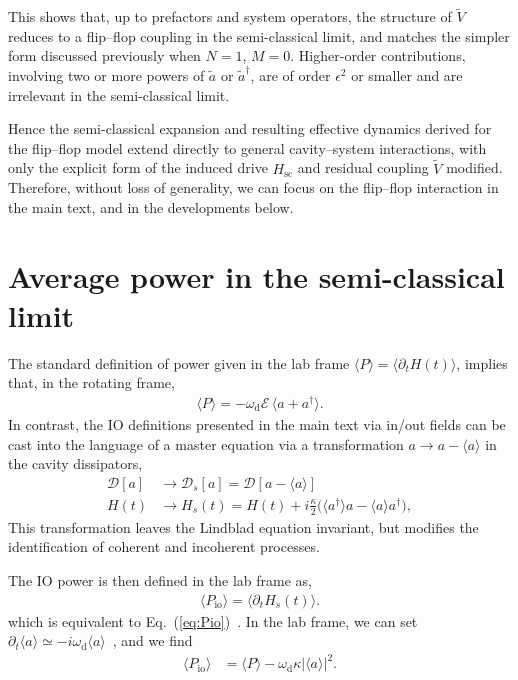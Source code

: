 \documentclass[aps,twocolumn,10pt,prl,floatfix,nofootinbib, superscriptaddress]{revtex4-2}
\begin{document}
This shows that, up to prefactors and system operators, the structure of $\tilde{V}$ reduces to a flip--flop coupling in the semi-classical limit, and matches the simpler form discussed previously when $N=1$, $M=0$.
Higher-order contributions, involving two or more powers of $\tilde{a}$ or $\tilde{a}^\dagger$, are of order $\epsilon^2$ or smaller and are irrelevant in the semi-classical limit.

Hence the semi-classical expansion and resulting effective dynamics derived for the flip--flop model extend directly to general cavity--system interactions, with only the explicit form of the induced drive $H_\text{sc}$ and residual coupling $\tilde{V}$ modified.
Therefore, without loss of generality, we can focus on the flip--flop interaction in the main text, and in the developments below.

\section{Average power in the semi-classical limit}

The standard definition of power given in the lab frame $\langle P \rangle  = \langle \partial_t H(t)\rangle$, implies that, in the rotating frame,
\begin{align}
    \langle P \rangle = -\omega_\text{d} \mathcal{E}\, \langle a + a^\dagger \rangle.
\end{align}
In contrast, the IO definitions presented in the main text via in/out fields can be cast into the language of a master equation via a transformation $a \to a - \langle a \rangle$ in the cavity dissipators,
\begin{align}
    \mathcal{D}[a] &\to \mathcal{D}_s[a] = \mathcal{D}[a - \langle a \rangle]\\
    H(t) &\to H_s(t) = H(t) + i\frac{\kappa}{2}\big(\langle a^\dagger\rangle a - \langle a\rangle a^\dagger\big),
\end{align}
This transformation leaves the Lindblad equation invariant, but modifies the identification of coherent and incoherent processes.

The IO power is then defined in the lab frame as,
\begin{align}
    \langle P_\text{io}\rangle = \langle\partial_t H_s(t)\rangle.
\end{align}
which is  equivalent to Eq.~(\ref{eq:Pio})~\cite{schrauwen2025}.
In the lab frame, we can set $\partial_t \langle a\rangle \simeq -i\omega_\text{d} \langle a \rangle$~\cite{schrauwen2025}, and we find
\begin{align}
\langle P_\text{io} \rangle  &= \langle P\rangle  -\omega_\text{d}\kappa\big|\langle a \rangle\big|^2.
\end{align}
\end{document}
